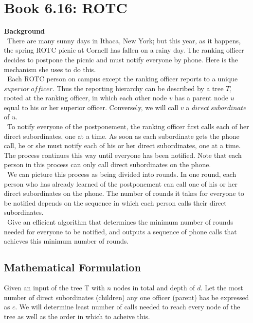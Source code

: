 \documentclass[12pt]{article}
\begin{document}
\section{Book 6.16: ROTC}
\textbf{Background} \\
~\indent There are many sunny days in Ithaca, New York; but this year, as it happens, the
spring ROTC picnic at Cornell has fallen on a rainy day. The ranking officer decides
to postpone the picnic and must notify everyone by phone. Here is the mechanism
she uses to do this. \\
~\indent Each ROTC person on campus except the ranking officer reports to a unique
$superior\ officer$. Thus the reporting hierarchy can be described by a tree $T$, rooted
at the ranking officer, in which each other node $v$ has a parent node $u$ equal to his or
her superior officer. Conversely, we will call $v$ a $direct\ subordinate$ of $u$. \\
~\indent To notify everyone of the postponement, the ranking officer first calls each of her
direct subordinates, one at a time. As soon as each subordinate gets the phone call,
he or she must notify each of his or her direct subordinates, one at a time. The
process continues this way until everyone has been notified. Note that each person in
this process can only call direct subordinates on the phone. \\
~\indent We can picture this process as being divided into rounds. In one round, each
person who has already learned of the postponement can call one of his or her direct
subordinates on the phone. The number of rounds it takes for everyone to be notified
depends on the sequence in which each person calls their direct subordinates. \\
~\indent Give an efficient algorithm that determines the minimum number of rounds needed
for everyone to be notified, and outputs a sequence of phone calls that achieves this
minimum number of rounds.


\newpage

\subsection{Mathematical Formulation}
Given an input of the tree T with $n$ nodes in total and depth of $d$. Let the most
number of direct subordinates (children) any one officer (parent) has be expressed as
$c$. We will determine least number of calls needed to reach every node of the tree as
well as the order in which to acheive this.
\end{document}
